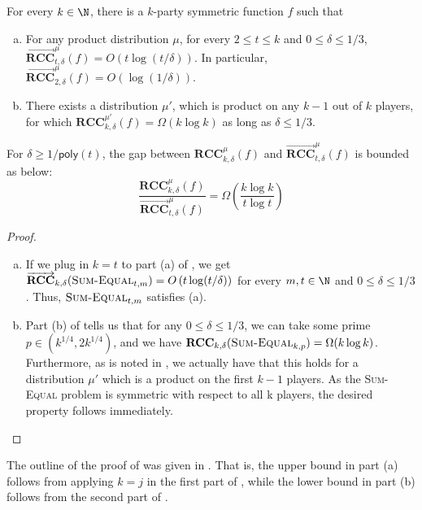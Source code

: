 \documentclass{toc}
\newcommand{\poly}{\mathsf{poly}}
\newcommand{\error}{\ensuremath{\delta}}
\newcommand{\bigo}[1]{\ensuremath{{{O} \left( {#1} \right)}}}
\newcommand{\bigomega}[1]{\ensuremath{{\Omega \left( {#1} \right)}}}
\newcommand{\rcc}{\ensuremath{\mathbf{RCC}}}
\newcommand{\rccone}{\ensuremath{\overrightarrow{\mathbf{RCC}}}}
\newcommand{\sumequal}{\textsc{Sum-Equal} }
\begin{document}
\begin{corollary}\label{corollary:log-separation}
For every $k\in \N$, there is a $k$-party symmetric function $f$ such that

\begin{enumerate}[(a)]
	\item For any product distribution $\mu$, 
              for every $2\le t\le k$ and $0\le \error \le 1/3$, 
	$\rccone_{t,\error}^{\mu}(f)=\bigo{t\log(t/\error)}$.
%
	In particular, $\rccone_{2,\error}^{\mu}(f)=\bigo{\log(1/\error)}$.

	\item There exists a distribution $\mu'$, which is product on any
              $k-1$ out of $k$ players, for which 
              $\rcc_{k,\error}^{\mu'}(f)= \bigomega{k\log k}$ 
              as long as $\error \le 1/3$.	
\end{enumerate}
\end{corollary}

For $\error\ge 1/\poly(t)$,  
the gap between $\rcc_{k,\error}^{\mu}(f)$ and $\rccone_{t,\error}^{\mu}(f)$ is bounded as below:
\[\frac{\rcc_{k,\error}^{\mu}(f)} {\rccone_{t,\error}^{\mu}(f)} = \bigomega{\frac{k\log k}{t\log t}}\]

{\color{black}
\begin{proof}
\begin{enumerate}[(a)]
    \item If we plug in $k=t$ to part (a) of , we get $\rccone_{k,\error}(\sumequal_{t,m}) = \bigo{t\log (t/\error)}$ for every $m,t \in \N$ and $0 \le \delta \le 1/3$. Thus, $\sumequal_{t,m}$ satisfies (a).
    \item Part (b) of  tells us that for any $0 \le \delta \le 1/3$, we can take some prime $p \in (k^{1/4},2k^{1/4})$, and we have $\rcc_{k,\delta}(\sumequal_{k,p}) = \Omega(k\log k)$. Furthermore, as is noted in , we actually have that this holds for a distribution $\mu'$ which is a product on the first $k-1$ players. As the \sumequal problem is symmetric with respect to all k players, the desired property follows immediately.
\end{enumerate}
\end{proof}
}

The outline of the proof of  was given in .
That is, the upper bound in part (a) follows from applying $k = j$ in 
the first part of ,
while the lower bound in part (b) follows from the second part of . 
\end{document}
